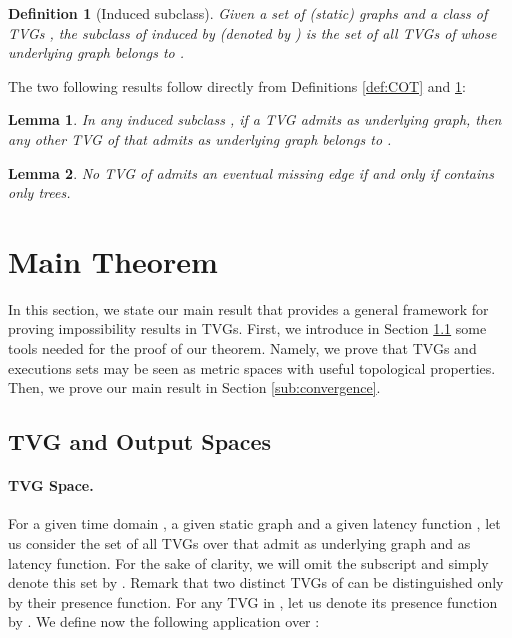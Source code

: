 \documentclass[11pt]{article}
\newtheorem{lemma}{Lemma}
\newtheorem{definition}{Definition}
\begin{document}
\begin{definition}[Induced subclass]\label{def:inducedsubclass}
Given a set of (static) graphs  and a class of TVGs , the subclass of  induced by  (denoted by ) is the set of all TVGs of  whose underlying graph belongs to .
\end{definition}

The two following results follow directly from Definitions \ref{def:COT} and \ref{def:inducedsubclass}:

\begin{lemma}\label{lem:lem5}
In any induced subclass , if a TVG  admits  as underlying graph, then any other TVG of  that admits  as underlying graph belongs to .
\end{lemma}

\begin{lemma}\label{lem:lem6}
No TVG of  admits an eventual missing edge if and only if  contains only  trees. 
\end{lemma}

\section{Main Theorem}\label{sec:main}

In this section, we state our main result that provides a general framework for proving impossibility results in TVGs. First, we introduce in Section \ref{sub:spaces} some tools needed for the proof of our theorem. Namely, we prove that TVGs and executions sets may be seen as metric spaces with useful topological properties. Then, we prove our main result in Section \ref{sub:convergence}.

\subsection{TVG and Output Spaces}\label{sub:spaces}

\paragraph{TVG Space.} For a given time domain , a given static graph  and a given latency function , let us consider the set  of all TVGs over  that admit  as underlying graph and  as latency function. For the sake of clarity, we will omit the subscript  and simply denote this set by . Remark that two distinct TVGs of  can be distinguished only by their presence function. For any TVG  in , let us denote its presence function by . We define now the following application  over :
\end{document}
